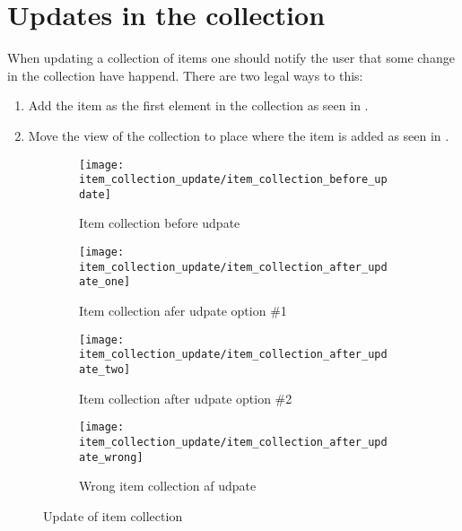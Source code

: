 \FloatBarrier

\section{Updates in the collection}
\label{sec:updates_in_the_collection}

When updating a collection of items one should notify the user that some change in the collection have happend. There are two legal ways to this:
\begin{enumerate}
    \item Add the item as the first element in the collection as seen in .
    \item Move the view of the collection to place where the item is added as seen in .
\end{enumerate}

\begin{figure}[htbp]
    \centering
    \begin{subfigure}[t]{0.2\textwidth}
        \centering
        \texttt{[image: item\_collection\_update/item\_collection\_before\_update]}
        \caption{Item collection before udpate}
        \label{fig:item_collection_before_update}
    \end{subfigure}
    \hspace{2em} 
    \begin{subfigure}[t]{0.2\textwidth}
        \centering
        \texttt{[image: item\_collection\_update/item\_collection\_after\_update\_one]}
        \caption{Item collection afer udpate option \#1}
        \label{fig:item_collection_after_update_one}
    \end{subfigure}
    \hspace{2em} 
    \begin{subfigure}[t]{0.2\textwidth}
        \centering
        \texttt{[image: item\_collection\_update/item\_collection\_after\_update\_two]}
        \caption{Item collection after udpate option \#2}
        \label{fig:item_collection_after_update_two}
    \end{subfigure}
    \hspace{2em} 
    \begin{subfigure}[t]{0.2\textwidth}
        \centering
        \texttt{[image: item\_collection\_update/item\_collection\_after\_update\_wrong]}
        \caption{Wrong item collection af udpate}
        \label{fig:item_collection_after_update_wrong}
    \end{subfigure}
    
    \caption{Update of item collection}
    \label{fig:item_collection_update}
\end{figure}

